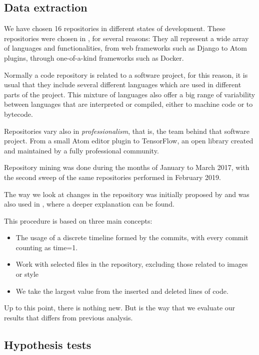 \documentclass[conference]{IEEEtran}
\begin{document}
\subsection{Data extraction}
We have chosen 16 repositories in different states of development.
These repositories were chosen in \cite{Merelo2016:repomining}, for several reasons:  They all represent a wide array of languages and functionalities, from web frameworks such as Django to Atom plugins, through one-of-a-kind frameworks such as Docker.

 Normally a code repository is related to a software project, for this reason, it is usual that they include several
different languages which are used in different parts of the project.
This mixture of languages also offer a big range of variability between languages that are interpreted or compiled, either to machine code or to
bytecode. 

Repositories vary also in {\em professionalism}, that is, the team behind that software project. From a small Atom editor plugin to TensorFlow, an open library created and maintained by a fully professional community.

Repository mining was done during the months of January to March
2017, with the second sweep of the same repositories performed in
February 2019.

The way we look at changes in the repository was initially proposed by \cite{Merelo2016:repomining} and was also used in
\cite{merelo2017self}, where a deeper explanation can be found.

This procedure is based on three main concepts:
\begin{itemize}
	\item The usage of a discrete timeline formed by the
	commits, with every commit counting as time=1. 
	\item Work with selected files in the repository, excluding 
	those related to images or style
	\item We take the largest value from the inserted and deleted lines of code.
\end{itemize}

Up to this point, there is nothing new. But is the way that we evaluate our results that differs from previous analysis.

\subsection{Hypothesis tests}
\end{document}
